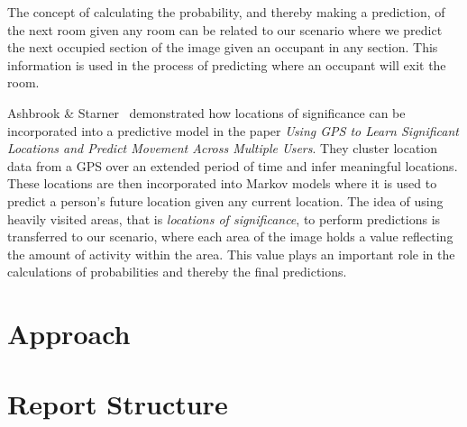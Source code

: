 The concept of calculating the probability, and thereby making a prediction, of the next room given any room can be related to our scenario where we predict the next occupied section of the image given an occupant in any section. This information is used in the process of predicting where an occupant will exit the room.

Ashbrook \& Starner~\cite{ashbrook} demonstrated how locations of significance can be incorporated into a predictive model in the paper \emph{Using GPS to Learn Significant Locations and Predict Movement Across Multiple Users}. They cluster location data from a GPS over an extended period of time and infer meaningful locations. These locations are then incorporated into Markov models where it is used to predict a person's future location given any current location. The idea of using heavily visited areas, that is \emph{locations of significance}, to perform predictions is transferred to our scenario, where each area of the image holds a value reflecting the amount of activity within the area. This value plays an important role in the calculations of probabilities and thereby the final predictions.

\section{Approach}


\section{Report Structure}

